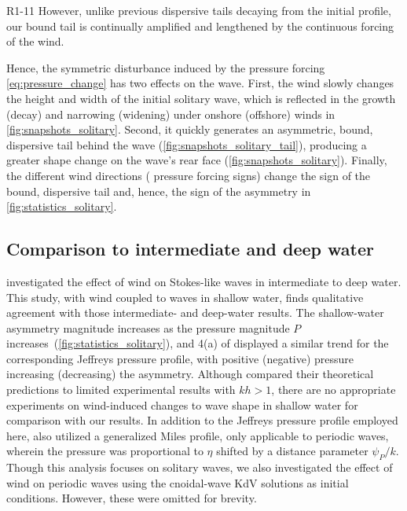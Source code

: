 \documentclass{jfm}
\begin{document}
\begin{LineLabel}{R1-11}
However, unlike previous dispersive tails decaying from the initial
profile, our bound tail is continually amplified and lengthened by the
continuous forcing of the wind.
\end{LineLabel}
Hence, the symmetric disturbance induced by the pressure forcing
\cref{eq:pressure_change} has two effects on the wave.
First, the wind slowly changes the height and width of the initial
solitary wave, which is reflected in the growth (decay) and narrowing
(widening) under onshore (offshore) winds in
\cref{fig:snapshots_solitary}.
Second, it quickly generates an asymmetric, bound, dispersive tail
behind the wave (\cref{fig:snapshots_solitary_tail}), producing a
greater shape change on the wave's rear face
(\cref{fig:snapshots_solitary}).
Finally, the different wind directions (\ie{} pressure forcing signs)
change the sign of the bound, dispersive tail and, hence, the sign of
the asymmetry in \cref{fig:statistics_solitary}.

\subsection{Comparison to intermediate and deep water}
 investigated the effect of
wind on Stokes-like waves in intermediate to deep water.
This study, with wind coupled to waves in shallow water, finds
qualitative agreement with those intermediate- and deep-water results.
The shallow-water asymmetry magnitude increases as the pressure
magnitude $P$ increases~(\cref{fig:statistics_solitary}), and \figname{}
4(a) of \citet{zdyrski2020wind} displayed a similar trend for the
corresponding Jeffreys pressure profile, with positive (negative)
pressure increasing (decreasing) the asymmetry.
Although \citet{zdyrski2020wind} compared their theoretical
predictions to limited experimental results with $kh > 1$, there are no
appropriate experiments on wind-induced changes to wave shape in shallow
water for comparison with our results.
In addition to the Jeffreys pressure profile employed here,
\citet{zdyrski2020wind} also utilized a generalized Miles profile,
only applicable to periodic waves, wherein the pressure was proportional
to $\eta$ shifted by a distance parameter $\psi_P/k$.
Though this analysis focuses on solitary waves, we also investigated the
effect of wind on periodic waves using the cnoidal-wave KdV solutions as
initial conditions.
However, these were omitted for brevity.
\end{document}
